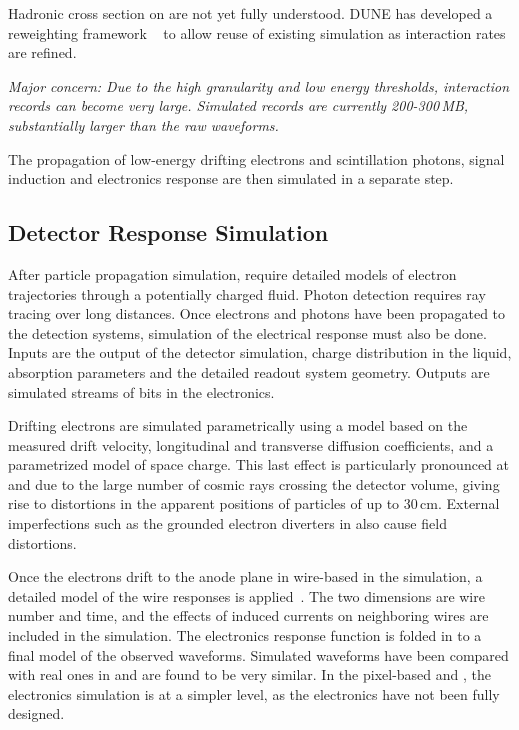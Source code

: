 \documentclass[../main-v1.tex]{subfiles}
\begin{document}
Hadronic cross section on  are not yet fully understood.  DUNE has developed a reweighting framework 
~\cite{Calcutt:2021zck} to allow reuse of existing simulation as interaction rates are refined.

{\it Major concern: 
Due to the high granularity and low energy thresholds, interaction records can become very large. Simulated  records are currently 200-300\,MB, substantially larger than the raw waveforms.}

The propagation of low-energy drifting electrons and scintillation photons, signal induction  and electronics response are then simulated in a separate step.


\subsection{Detector Response Simulation}
After particle propagation simulation, 
 require detailed models of electron trajectories through a potentially charged fluid.  Photon detection requires ray tracing over long distances.  Once electrons and photons have been propagated to the detection systems, simulation of the electrical response must also be done. Inputs are the output of the detector simulation, charge distribution in the liquid, absorption parameters and the detailed readout system geometry. Outputs are simulated streams of bits in the electronics. 

  




Drifting electrons are simulated parametrically using a model based on the measured drift velocity, longitudinal and transverse diffusion coefficients, and a parametrized model of space charge.  This last effect is particularly pronounced at  and  due to the large number of cosmic rays crossing the detector volume, giving rise to distortions in the apparent positions of particles of up to 30\,cm.  %
External imperfections such as the grounded electron diverters in  also cause field distortions.

Once the electrons drift to the anode plane in wire-based  in the simulation, a detailed \twod model of the wire responses is applied~\cite{Abi:2020mwi}.  The two dimensions are wire number and time, and the effects of induced currents on neighboring wires are included in the simulation.  The electronics response function is folded in to a final model of the observed waveforms.  Simulated waveforms have been compared with real ones  in  and are found to be very similar.
In the pixel-based  and , the electronics simulation is at a simpler level, as the electronics have not been fully designed.
\end{document}
